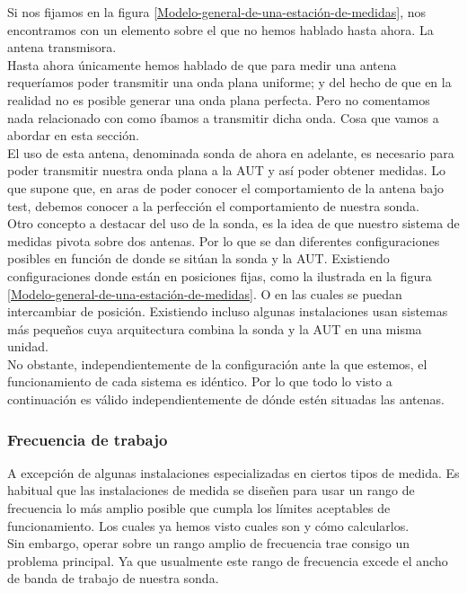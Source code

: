 Si nos fijamos en la figura \ref{Modelo-general-de-una-estación-de-medidas}, nos encontramos con un elemento sobre el que no hemos hablado hasta ahora. La antena transmisora.\\
Hasta ahora únicamente hemos hablado de que para medir una antena requeríamos poder transmitir una onda plana uniforme; y del hecho de que en la realidad no es posible generar una onda plana perfecta. Pero no comentamos nada relacionado con como íbamos a transmitir dicha onda. Cosa que vamos a abordar en esta sección. 
\\

El uso de esta antena, denominada sonda de ahora en adelante, es necesario para poder transmitir nuestra onda plana a la AUT y así poder obtener medidas. Lo que supone que, en aras de poder conocer el comportamiento de la antena bajo test, debemos conocer a la perfección el comportamiento de nuestra sonda.
\\

Otro concepto a destacar del uso de la sonda, es la idea de que nuestro sistema de medidas pivota sobre dos antenas. Por lo que se dan diferentes configuraciones posibles en función de donde se sitúan la sonda y la AUT. Existiendo configuraciones donde están en posiciones fijas, como la ilustrada en la figura \ref{Modelo-general-de-una-estación-de-medidas}. O en las cuales se puedan intercambiar de posición. Existiendo incluso algunas instalaciones usan sistemas más pequeños cuya arquitectura combina la sonda y la AUT en una misma unidad. 
\\

No obstante, independientemente de la configuración ante la que estemos, el funcionamiento de cada sistema es idéntico. Por lo que todo lo visto a continuación es válido independientemente de dónde estén situadas las antenas. 

\subsubsection{Frecuencia de trabajo}

A excepción de algunas instalaciones especializadas en ciertos tipos de medida. Es habitual que las instalaciones de medida se diseñen para usar un rango de frecuencia lo más amplio posible que cumpla los límites aceptables de funcionamiento. Los cuales ya hemos visto cuales son y cómo calcularlos.
\\

Sin embargo, operar sobre un rango amplio de frecuencia trae consigo un problema principal. Ya que usualmente este rango de frecuencia excede el ancho de banda de trabajo de nuestra sonda. 
\\

